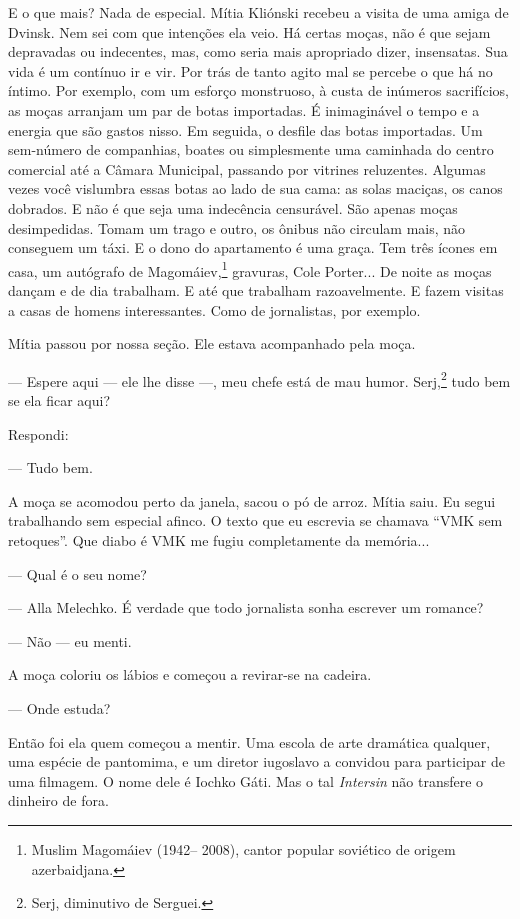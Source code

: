 E o que mais? Nada de especial. Mítia Kliónski recebeu a visita de uma
amiga de Dvinsk. Nem sei com que intenções ela veio. Há certas moças,
não é que sejam depravadas ou indecentes, mas, como seria mais
apropriado dizer, insensatas. Sua vida é um contínuo ir e vir. Por trás
de tanto agito mal se percebe o que há no íntimo. Por exemplo, com um
esforço monstruoso, à custa de inúmeros sacrifícios, as moças arranjam
um par de botas importadas. É inimaginável o tempo e a energia que são
gastos nisso. Em seguida, o desfile das botas importadas. Um sem-número
de companhias, boates ou simplesmente uma caminhada do centro comercial
até a Câmara Municipal, passando por vitrines reluzentes. Algumas vezes
você vislumbra essas botas ao lado de sua cama: as solas maciças, os
canos dobrados. E não é que seja uma indecência censurável. São apenas
moças desimpedidas. Tomam um trago e outro, os ônibus não circulam mais,
não conseguem um táxi. E o dono do apartamento é uma graça. Tem três
ícones em casa, um autógrafo de Magomáiev,\footnote{Muslim Magomáiev
  (1942-- 2008), cantor popular soviético de origem azerbaidjana.}
gravuras, Cole Porter... De noite as moças dançam e de dia trabalham. E
até que trabalham razoavelmente. E fazem visitas a casas de homens
interessantes. Como de jornalistas, por exemplo.

Mítia passou por nossa seção. Ele estava acompanhado pela moça.

--- Espere aqui --- ele lhe disse ---, meu chefe está de mau humor.
Serj,\footnote{Serj, diminutivo de Serguei.} tudo bem se ela ficar aqui?

Respondi:

--- Tudo bem.

A moça se acomodou perto da janela, sacou o pó de arroz. Mítia saiu. Eu
segui trabalhando sem especial afinco. O texto que eu escrevia se
chamava ``VMK sem retoques''. Que diabo é VMK me fugiu completamente da
memória...

--- Qual é o seu nome?

--- Alla Melechko. É verdade que todo jornalista sonha escrever um
romance?

--- Não --- eu menti.

A moça coloriu os lábios e começou a revirar-se na cadeira.

--- Onde estuda?

Então foi ela quem começou a mentir. Uma escola de arte dramática
qualquer, uma espécie de pantomima, e um diretor iugoslavo a convidou
para participar de uma filmagem. O nome dele é Iochko Gáti. Mas o tal
\emph{Intersin} não transfere o dinheiro de fora.

